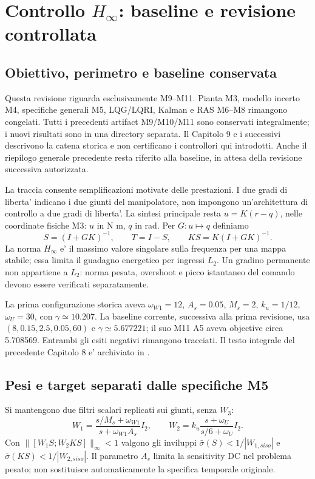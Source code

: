 \chapter{Controllo $H_\infty$: baseline e revisione controllata}
\label{cap:hinf}
\section{Obiettivo, perimetro e baseline conservata}
Questa revisione riguarda esclusivamente M9--M11. Pianta M3, modello
incerto M4, specifiche generali M5, LQG/LQRI, Kalman e RAS M6--M8
rimangono congelati. Tutti i precedenti artifact M9/M10/M11 sono conservati
integralmente; i nuovi risultati sono in una directory separata.
Il Capitolo 9 e i successivi descrivono la catena storica e non certificano
i controllori qui introdotti. Anche il riepilogo generale precedente
resta riferito alla baseline, in attesa della revisione successiva autorizzata.

La traccia consente semplificazioni motivate delle prestazioni.
I due gradi di liberta' indicano i due giunti del manipolatore, non impongono
un'architettura di controllo a due gradi di liberta'. La sintesi principale
resta $u=K(r-q)$, nelle coordinate fisiche M3: $u$ in N m, $q$ in rad.
Per $G:u\mapsto q$ definiamo
\[
S=(I+GK)^{-1},\qquad T=I-S,\qquad KS=K(I+GK)^{-1}.
\]
La norma $H_\infty$ e' il massimo valore singolare sulla frequenza per una
mappa stabile; essa limita il guadagno energetico per ingressi $L_2$.
Un gradino permanente non appartiene a $L_2$: norma pesata, overshoot e
picco istantaneo del comando devono essere verificati separatamente.

La prima configurazione storica aveva $\omega_{W1}=12$, $A_s=0.05$,
$M_s=2$, $k_u=1/12$, $\omega_U=30$, con $\gamma\simeq10.207$.
La baseline corrente, successiva alla prima revisione, usa
$(8,0.15,2.5,0.05,60)$ e $\gamma\simeq5.677221$; il suo M11 A5
aveva objective circa 5.708569. Entrambi gli esiti negativi rimangono
tracciati. Il testo integrale del precedente Capitolo 8 e' archiviato in
.

\section{Pesi e target separati dalle specifiche M5}
Si mantengono due filtri scalari replicati sui giunti, senza $W_3$:
\[
W_1=\frac{s/M_s+\omega_{W1}}{s+\omega_{W1}A_s}I_2,\qquad
W_2=k_u\frac{s+\omega_U}{s/6+\omega_U}I_2.
\]
Con $\|[W_1S;W_2KS]\|_\infty<1$ valgono gli inviluppi
$\bar\sigma(S)<1/|W_{1,siso}|$ e $\bar\sigma(KS)<1/|W_{2,siso}|$.
Il parametro $A_s$ limita la sensitivity DC nel problema pesato;
non sostituisce automaticamente la specifica temporale originale.

